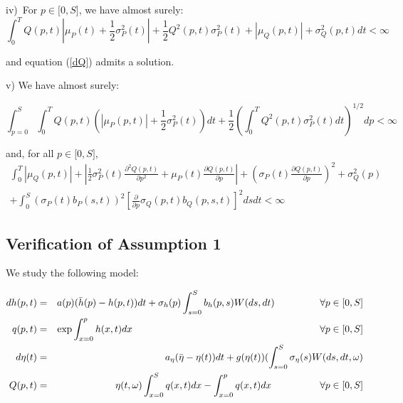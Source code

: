\documentclass{article}
\begin{document}
iv)\ For $p\in \lbrack 0,S]$, we have almost surely:%
\begin{equation*}
\int_{0}^{T}Q(p,t)|\mu _{P}(t)+\frac{1}{2}\sigma _{P}^{2}(t)|+\frac{1}{2}%
Q^{2}(p,t)\sigma _{P}^{2}(t)+|\mu _{Q}(p,t)|+\sigma _{Q}^{2}(p,t)dt<\infty
\end{equation*}

and equation (\ref{dQ}) admits a solution.

v) We have almost surely:

\begin{equation*}
\int_{p=0}^{S}\int_{0}^{T}Q(p,t)(|\mu _{P}(p,t)|+\frac{1}{2}\sigma
_{P}^{2}(t))dt+\frac{1}{2}(\int_{0}^{T}Q^{2}(p,t)\sigma
_{P}^{2}(t)dt)^{1/2}dp<\infty \ 
\end{equation*}

\qquad and, for all $p\in \lbrack 0,S]$,%
\begin{gather*}
\int_{0}^{T}|\mu _{Q}(p,t)|+|\frac{1}{2}\sigma _{P}^{2}(t)\frac{\partial
^{2}Q(p,t)}{\partial p^{2}}+\mu _{P}(t)\frac{\partial Q(p,t)}{\partial p}%
|+\left( \sigma _{P}(t)\frac{\partial Q(p,t)}{\partial p}\right) ^{2}+\sigma
_{Q}^{2}(p) \\
+\int_{0}^{S}(\sigma _{P}(t)b_{P}(s,t))^{2}[\frac{\partial }{\partial p}%
\sigma _{Q}(p,t)b_{Q}(p,s,t)]^{2}dsdt<\infty
\end{gather*}

\subsection{Verification of Assumption 1}

We study the following model:

\begin{eqnarray}
dh(p,t) &=&a(p)(\bar{h}(p)-h(p,t))dt+\sigma
_{h}(p)\int_{s=0}^{S}b_{h}(p,s)W(ds,dt)\text{ \ \ \ \ \ \ \ \ \ \ \ }\forall
p\in \lbrack 0,S]  \label{equ_h_A} \\
q(p,t) &=&\exp {\int_{x=0}^{p}h(x,t)dx}\text{ \ \ \ \ \ \ \ \ \ \ \ \ \ \ \
\ \ \ \ \ \ \ \ \ \ \ \ \ \ \ \ \ \ \ \ \ \ \ \ \ \ \ \ \ \ \ \ \ \ \ \ \ \
\ \ }\forall p\in \lbrack 0,S]  \label{equ_q_A} \\
d\eta (t) &=&a_{\eta }(\bar{\eta}-\eta (t))dt+g(\eta
(t))(\int_{s=0}^{S}\sigma _{\eta }(s)W(ds,dt,\omega )  \label{equ_eta_A_bis}
\\
Q(p,t) &=&\eta (t,\omega )\int_{x=0}^{S}q(x,t)dx-\int_{x=0}^{p}q(x,t)dx\text{
\ \ \ \ \ \ \ \ \ \ \ \ }\forall p\in \lbrack 0,S]  \label{equ_Q_A}
\end{eqnarray}
\end{document}
